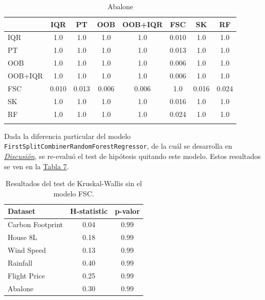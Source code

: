 \begin{longtable}{lccccccc}
\toprule
   & IQR     & PT     & OOB     & OOB+IQR     & FSC      & SK     & RF     \\
\midrule
IQR  & 1.0   & 1.0   & 1.0   & 1.0   & 0.010  & 1.0   & 1.0    \\
PT  & 1.0   & 1.0   & 1.0   & 1.0   & 0.013  & 1.0   & 1.0    \\
OOB  & 1.0   & 1.0   & 1.0   & 1.0   & 0.006  & 1.0   & 1.0    \\
OOB+IQR  & 1.0   & 1.0   & 1.0   & 1.0   & 0.006  & 1.0   & 1.0    \\
FSC  & 0.010 & 0.013 & 0.006 & 0.006 & 1.0    & 0.016 & 0.024  \\
SK  & 1.0   & 1.0   & 1.0   & 1.0   & 0.016  & 1.0   & 1.0    \\
RF  & 1.0   & 1.0   & 1.0   & 1.0   & 0.024  & 1.0   & 1.0    \\
\bottomrule
\caption{Abalone}
\end{longtable}
\label{tab6}

Dada la diferencia particular del modelo \texttt{FirstSplitCombinerRandomForestRegressor}, de la cuál se desarrolla en \textit{\hyperref[ch::capitulo8]{Discusión}}, se re-evaluó el test de hipótesis quitando este modelo. Estos resultados se ven en la \hyperref[tab7]{Tabla 7}.

\begin{table}[h!]
\centering
\begin{tabular}{lcc}
\toprule
\textbf{Dataset} & \textbf{H-statistic} & \textbf{p-valor} \\
\midrule
Carbon Footprint & 0.04  & 0.99 \\
House 8L         & 0.18  & 0.99 \\
Wind Speed       & 0.13  & 0.99 \\
Rainfall         & 0.40 & 0.99 \\
Flight Price     & 0.25 & 0.99 \\
Abalone          & 0.30 & 0.99 \\
\bottomrule
\end{tabular}
\caption{Resultados del test de Kruskal-Wallis sin el modelo FSC.}
\label{tab7}
\end{table}
